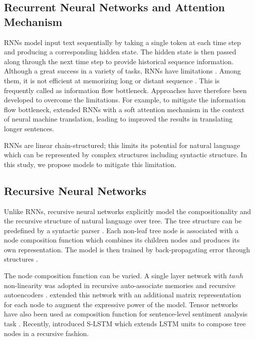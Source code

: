 \documentclass[11pt]{article}
\begin{document}
\subsection{Recurrent Neural Networks and Attention Mechanism}
RNNs model input text sequentially by taking a single token at each time step and producing a corresponding hidden state. The hidden state is then passed along through the next time step to provide historical sequence information. Although a great success in a variety of tasks, RNNs have limitations \cite{bengio:94,hochreiter:98}. Among them, it is not efficient at memorizing long or distant sequence \cite{sutskever:14}. This is frequently called as information flow bottleneck.
Approaches have therefore been developed to overcome the limitations. 
For example, to mitigate the information flow bottleneck,  extended RNNs with a soft attention mechanism in the context of neural machine translation, leading to improved the results in translating longer sentences. 


RNNs are linear chain-structured; this limits its potential for natural language which can be represented by complex structures including syntactic structure. In this study, we propose models to mitigate this limitation. 





\subsection{Recursive Neural Networks}

Unlike RNNs, recursive neural networks explicitly model the compositionality and the recursive structure of natural language over tree. The tree structure can be predefined by a syntactic parser \cite{socher2013recursive}. Each non-leaf tree node is associated with a node composition function which combines its children nodes and produces its own representation. The model is then trained by back-propagating error through structures \cite{goller1996learning}.

The node composition function can be varied. A single layer network with $tanh$ non-linearity was adopted in recursive auto-associate memories \cite{pollack1990recursive} and recursive autoencoders \cite{socher2011semi}.  extended this network with an additional matrix representation for each node to augment the expressive power of the model. Tensor networks have also been used as composition function for sentence-level sentiment analysis task \cite{socher2013recursive}. Recently,  introduced S-LSTM which extends LSTM units to compose tree nodes in a recursive fashion. 
\end{document}
